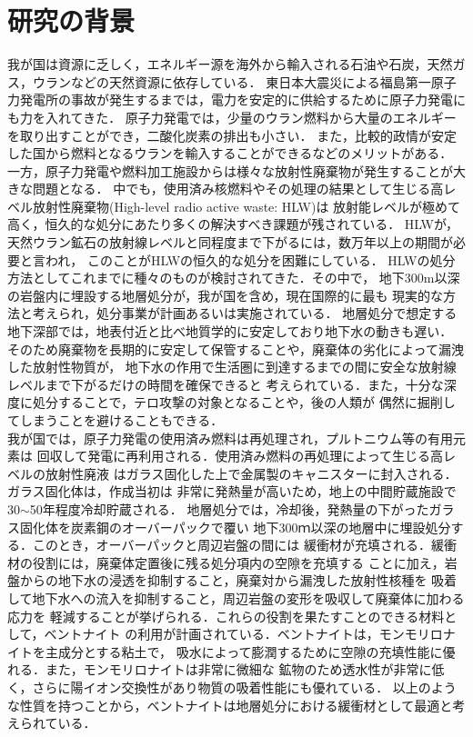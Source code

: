 \section{研究の背景}
我が国は資源に乏しく，エネルギー源を海外から輸入される石油や石炭，天然ガス，ウランなどの天然資源に依存している．
東日本大震災による福島第一原子力発電所の事故が発生するまでは，電力を安定的に供給するために原子力発電にも力を入れてきた．
原子力発電では，少量のウラン燃料から大量のエネルギーを取り出すことができ，二酸化炭素の排出も小さい．
また，比較的政情が安定した国から燃料となるウランを輸入することができるなどのメリットがある．
一方，原子力発電や燃料加工施設からは様々な放射性廃棄物が発生することが大きな問題となる．
中でも，使用済み核燃料やその処理の結果として生じる高レベル放射性廃棄物(High-level radio active waste: HLW)は
放射能レベルが極めて高く，恒久的な処分にあたり多くの解決すべき課題が残されている．
HLWが，天然ウラン鉱石の放射線レベルと同程度まで下がるには，数万年以上の期間が必要と言われ，
このことがHLWの恒久的な処分を困難にしている．
HLWの処分方法としてこれまでに種々のものが検討されてきた．その中で，
地下300m以深の岩盤内に埋設する地層処分が，我が国を含め，現在国際的に最も
現実的な方法と考えられ，処分事業が計画あるいは実施されている．
地層処分で想定する地下深部では，地表付近と比べ地質学的に安定しており地下水の動きも遅い．
そのため廃棄物を長期的に安定して保管することや，廃棄体の劣化によって漏洩した放射性物質が，
地下水の作用で生活圏に到達するまでの間に安全な放射線レベルまで下がるだけの時間を確保できると
考えられている．また，十分な深度に処分することで，テロ攻撃の対象となることや，後の人類が
偶然に掘削してしまうことを避けることもできる．\\

我が国では，原子力発電の使用済み燃料は再処理され，プルトニウム等の有用元素は
回収して発電に再利用される．使用済み燃料の再処理によって生じる高レベルの放射性廃液
はガラス固化した上で金属製のキャニスターに封入される．ガラス固化体は，作成当初は
非常に発熱量が高いため，地上の中間貯蔵施設で30$\sim$50年程度冷却貯蔵される．
地層処分では，冷却後，発熱量の下がったガラス固化体を炭素鋼のオーバーパックで覆い
地下300ｍ以深の地層中に埋設処分する．このとき，オーバーパックと周辺岩盤の間には
緩衝材が充填される．緩衝材の役割には，廃棄体定置後に残る処分項内の空隙を充填する
ことに加え，岩盤からの地下水の浸透を抑制すること，廃棄対から漏洩した放射性核種を
吸着して地下水への流入を抑制すること，周辺岩盤の変形を吸収して廃棄体に加わる応力を
軽減することが挙げられる．これらの役割を果たすことのできる材料として，ベントナイト
の利用が計画されている．ベントナイトは，モンモリロナイトを主成分とする粘土で，
吸水によって膨潤するために空隙の充填性能に優れる．また，モンモリロナイトは非常に微細な
鉱物のため透水性が非常に低く，さらに陽イオン交換性があり物質の吸着性能にも優れている．
以上のような性質を持つことから，ベントナイトは地層処分における緩衝材として最適と考えられている．\\

